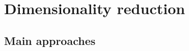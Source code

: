 \documentclass[10pt,compress]{beamer} %
\begin{document}

\section{Dimensionality reduction}
\subsection{Main approaches}
\end{document}
